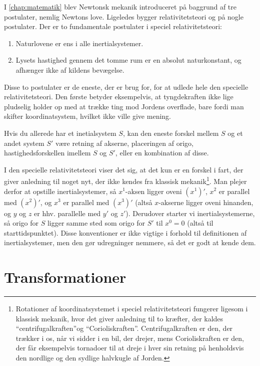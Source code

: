 \documentclass[crop=false, class=memoir]{standalone}
\begin{document}
I \cref{chap:matematik} blev Newtonsk mekanik introduceret på baggrund af tre postulater, nemlig Newtons love. Ligeledes bygger relativitetsteori og på nogle postulater. Der er to fundamentale postulater i speciel relativitetsteori:
%
\begin{enumerate}
    \item Naturlovene er ens i alle inertialsystemer.
    \item Lysets hastighed gennem det tomme rum er en absolut naturkonstant, og afhænger ikke af kildens bevægelse.
\end{enumerate}
%
Disse to postulater er de eneste, der er brug for, for at udlede hele den specielle relativitetsteori. Den første betyder eksempelvis, at tyngdekraften ikke lige pludselig holder op med at trække ting mod Jordens overflade, bare fordi man skifter koordinatsystem, hvilket ikke ville give mening.

Hvis du allerede har et inetialsystem $S$, kan den eneste forskel mellem $S$ og et andet system $S'$ være retning af akserne, placeringen af origo, hastighedsforskellen imellem $S$ og $S'$, eller en kombination af disse.

I den specielle relativitetsteori viser det sig, at det kun er en forskel i fart, der giver anledning til noget nyt, der ikke kendes fra klassisk mekanik\footnote{Rotationer af koordinatsystemet i speciel relativitetsteori fungerer ligesom i klassisk mekanik, hvor det giver anledning til to kræfter, der kaldes ``centrifugalkraften''og ``Corioliskraften''. Centrifugalkraften er den, der trækker i os, når vi sidder i en bil, der drejer, mens Corioliskraften er den, der får eksempelvis tornadoer til at dreje i hver sin retning på henholdsvis den nordlige og den sydlige halvkugle af Jorden.}. Man plejer derfor at opstille inertialsystemer, så $x^1$-aksen ligger oveni $\left(x^1\right)'$, $x^2$ er parallel med $\left(x^2\right)'$, og $x^3$ er parallel med $\left(x^3\right)'$ (altså $x$-akserne ligger oveni hinanden, og $y$ og $z$ er hhv. parallelle med $y'$ og $z'$). Derudover starter vi inertialsystemerne, så origo for $S$ ligger samme sted som origo for $S'$ til $x^0=0$ (altså til starttidspunktet). Disse konventioner er ikke vigtige i forhold til definitionen af inertialsystemer, men den gør udregninger nemmere, så det er godt at kende dem.


\section{Transformationer} \label{rel:sec:trans} %
\end{document}
